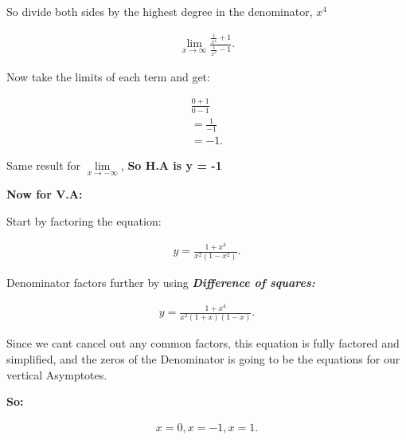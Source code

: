 \documentclass{report}
\begin{document}
        \bigbreak \noindent 
        So divide both sides by the highest degree in the denominator, \textbf{\textit{$x^4$}}
        
        \begin{align*}
            \lim\limits_{x \to \infty}{ \frac{\frac{1}{x^4} + 1}{ \frac{1}{x^2} - 1}} 
        .\end{align*}

        \bigbreak \noindent 
        Now take the limits of each term and get:

        \begin{align*}
           \frac{0 + 1}{0 - 1} \\
        = \frac{1}{-1} \\ 
        = -1
        .\end{align*}

        \bigbreak \noindent 
        Same result for $\lim\limits_{x \to - \infty}{}$, \textbf{So H.A is y = -1}

        \bigbreak \noindent \bigbreak \noindent 
        \textbf{Now for V.A:}

        \bigbreak \noindent 
        Start by factoring the equation:

        \begin{align*}
            y = \frac{1 + x^4}{x^2 \left(1 - x^2\right)}
        .\end{align*}

        \bigbreak \noindent 
        Denominator factors further by using \textbf{\textit{Difference of squares:}}

        \begin{align*}
            y = \frac{1 + x^4}{x^2 \left(1 + x\right) \left(1 - x\right)}
        .\end{align*}

        \bigbreak \noindent 
        Since we cant cancel out any common factors, this equation is fully factored and simplified,
        and the zeros of the Denominator is going to be the equations for our vertical Asymptotes.

        \bigbreak \noindent 
        \textbf{So:}

        \begin{align*}
            x = 0, x = -1, x = 1
        .\end{align*}
\end{document}
